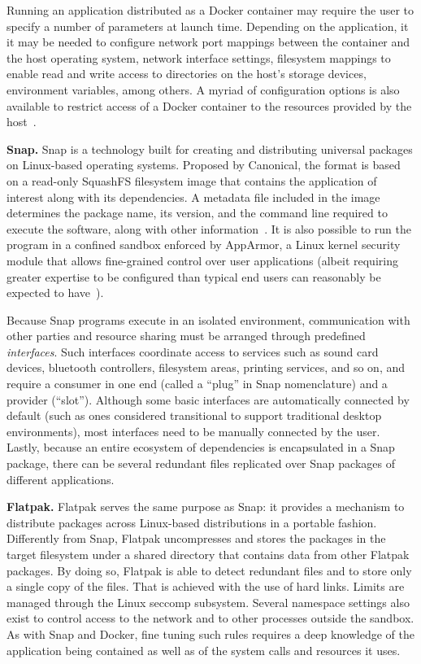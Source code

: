 \documentclass[sigplan, anonymous, 10pt]{acmart}
\begin{document}
Running an application distributed as a Docker container may require the user to
specify a number of parameters at launch time. Depending on the application, it
it may be needed to configure network port mappings between the container and the
host operating system, network interface settings, filesystem mappings to enable
read and write access to directories on the host's storage devices, environment
variables, among others. A myriad of configuration options is also available to
restrict access of a Docker container to the resources provided by the
host~\cite{krochmalski2016:docker}.

\textbf{Snap.}
Snap is a technology built for creating and distributing universal packages on Linux-based
operating systems. Proposed by Canonical, the format is based on a read-only SquashFS filesystem
image that contains the application of interest along with its dependencies. A metadata file
included in the image determines the package name, its version, and the command line required
to execute the software, along with other information~\cite{canonical2011:snapcraft}.
It is also possible to run the program in a confined sandbox enforced by AppArmor, a Linux kernel
security module that allows fine-grained control over user applications (albeit requiring greater
expertise to be configured than typical end users can reasonably be expected to
have~\cite{schreuders2011:empowering}).

Because Snap programs execute in an isolated environment, communication with other parties
and resource sharing must be arranged through predefined \emph{interfaces}. Such interfaces
coordinate access to services such as sound card devices, bluetooth controllers, filesystem
areas, printing services, and so on, and require a consumer in one end (called a ``plug''
in Snap nomenclature) and a provider (``slot''). Although some basic interfaces are automatically
connected by default (such as ones considered transitional to support traditional desktop
environments), most interfaces need to be manually connected by the user. Lastly, because
an entire ecosystem of dependencies is encapsulated in a Snap package, there can be several
redundant files replicated over Snap packages of different applications.

\textbf{Flatpak.}
Flatpak serves the same purpose as Snap: it provides a mechanism to distribute packages
across Linux-based distributions in a portable fashion. Differently from Snap, Flatpak
uncompresses and stores the packages in the target filesystem under a shared directory
that contains data from other Flatpak packages. By doing so, Flatpak is able to detect
redundant files and to store only a single copy of the files. That is achieved with the
use of hard links. Limits are managed through the Linux seccomp subsystem.
Several namespace settings also exist to control access to the network and to other
processes outside the sandbox. As with Snap and Docker, fine tuning such rules requires a deep
knowledge of the application being contained as well as of the system calls and resources
it uses.
\end{document}

